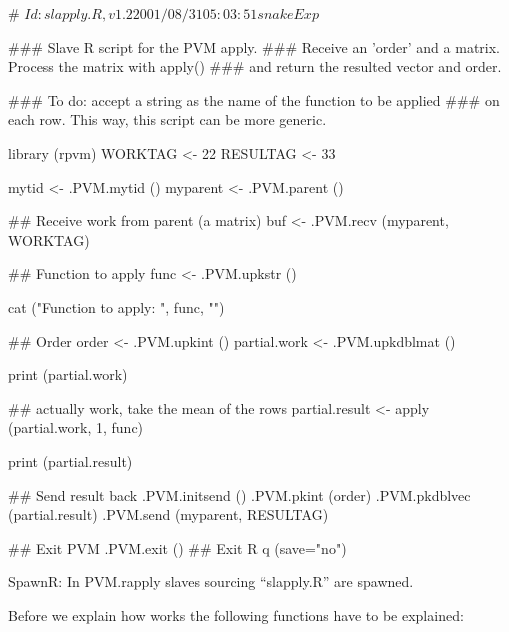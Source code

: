 \begin{Example}
\begin{Scode}
# $Id: slapply.R,v 1.2 2001/08/31 05:03:51 snake Exp $

### Slave R script for the PVM apply.
### Receive an 'order' and a matrix.  Process the matrix with apply()
### and return the resulted vector and order.

### To do: accept a string as the name of the function to be applied
### on each row.  This way, this script can be more generic. 

library (rpvm)
WORKTAG <- 22
RESULTAG <- 33

mytid  <- .PVM.mytid ()
myparent  <- .PVM.parent ()

## Receive work from parent (a matrix)
buf <- .PVM.recv (myparent, WORKTAG)

## Function to apply
func  <- .PVM.upkstr ()

cat ("Function to apply: ", func, "\n")

## Order
order <- .PVM.upkint ()
partial.work <- .PVM.upkdblmat ()

print (partial.work)

## actually work, take the mean of the rows
partial.result <- apply (partial.work, 1, func)

print (partial.result)

## Send result back
.PVM.initsend ()
.PVM.pkint (order)
.PVM.pkdblvec (partial.result)
.PVM.send (myparent, RESULTAG)

## Exit PVM
.PVM.exit ()
## Exit R
q (save="no")
\end{Scode}
\label{ex:rpvm-rapplyslave}
\end{Example}

SpawnR: In 
  PVM.rapply  slaves sourcing ``slapply.R'' are
  spawned. 

Before we explain how  works the following 
functions have to be explained:

